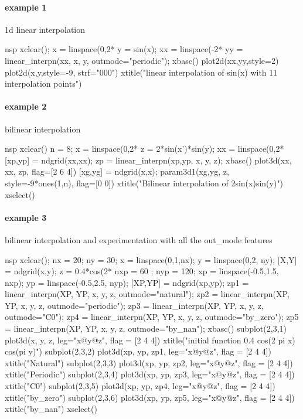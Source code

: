 
\begin{examples}
\paragraph{example 1}  1d linear interpolation
\begin{mintednsp}{nsp}
xclear();
x = linspace(0,2*%
y = sin(x);
xx = linspace(-2*%
yy = linear_interpn(xx, x, y, outmode="periodic");
xbasc()
plot2d(xx,yy,style=2)
plot2d(x,y,style=-9, strf="000")
xtitle("linear interpolation of sin(x) with 11 interpolation points")
\end{mintednsp}

\paragraph{example 2} bilinear interpolation
\begin{mintednsp}{nsp}
xclear()
n = 8;
x = linspace(0,2*%
z = 2*sin(x')*sin(y);
xx = linspace(0,2*%
[xp,yp] = ndgrid(xx,xx);
zp = linear_interpn(xp,yp, x, y, z);
xbasc()
plot3d(xx, xx, zp, flag=[2 6 4])
[xg,yg] = ndgrid(x,x);
param3d1(xg,yg, z, style=-9*ones(1,n), flag=[0 0])
xtitle("Bilinear interpolation of 2sin(x)sin(y)")
xselect()
\end{mintednsp}

\paragraph{example 3} bilinear interpolation and experimentation with all the out\_mode features
\begin{mintednsp}{nsp}
xclear();
nx = 20; ny = 30;
x = linspace(0,1,nx);
y = linspace(0,2, ny);
[X,Y] = ndgrid(x,y);
z = 0.4*cos(2*%
nxp = 60 ; nyp = 120;
xp = linspace(-0.5,1.5, nxp);
yp = linspace(-0.5,2.5, nyp);
[XP,YP] = ndgrid(xp,yp);
zp1 = linear_interpn(XP, YP, x, y, z, outmode="natural");
zp2 = linear_interpn(XP, YP, x, y, z, outmode="periodic");
zp3 = linear_interpn(XP, YP, x, y, z, outmode="C0");
zp4 = linear_interpn(XP, YP, x, y, z, outmode="by_zero");
zp5 = linear_interpn(XP, YP, x, y, z, outmode="by_nan");
xbasc()
subplot(2,3,1)
   plot3d(x, y, z, leg="x@y@z", flag = [2 4 4])
   xtitle("initial function 0.4 cos(2 pi x) cos(pi y)")
subplot(2,3,2)
   plot3d(xp, yp, zp1, leg="x@y@z", flag = [2 4 4])
   xtitle("Natural")
subplot(2,3,3)
   plot3d(xp, yp, zp2, leg="x@y@z", flag = [2 4 4])
   xtitle("Periodic")
subplot(2,3,4)
   plot3d(xp, yp, zp3, leg="x@y@z", flag = [2 4 4])
   xtitle("C0")
subplot(2,3,5)
   plot3d(xp, yp, zp4, leg="x@y@z", flag = [2 4 4])
   xtitle("by_zero")
subplot(2,3,6)
   plot3d(xp, yp, zp5, leg="x@y@z", flag = [2 4 4])
   xtitle("by_nan")
xselect()
\end{mintednsp}



\end{examples}
